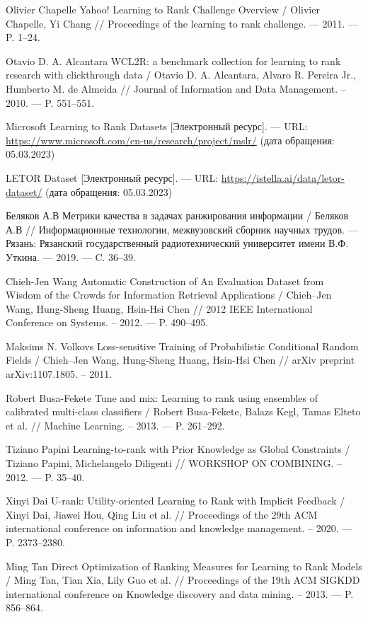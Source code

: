 \begin{thebibliography}{}
 Olivier Chapelle Yahoo! Learning to Rank Challenge Overview / Olivier Chapelle, Yi Chang  // Proceedings of the learning to rank challenge. --- 2011. --- P. 1--24.

 Otavio D. A. Alcantara WCL2R: a benchmark collection for learning to rank research with clickthrough data / Otavio D. A. Alcantara, Alvaro R. Pereira Jr., Humberto M. de Almeida // Journal of Information and Data Management. – 2010. --- P. 551--551.

 Microsoft Learning to Rank Datasets [Электронный ресурс]. --- URL: \url{https://www.microsoft.com/en-us/research/project/mslr/} (дата обращения: 05.03.2023)

 LETOR Dataset [Электронный ресурс]. --- URL: \url{https://istella.ai/data/letor-dataset/} (дата обращения: 05.03.2023)

 Беляков А.В Метрики качества в задачах ранжирования информации / Беляков А.В // Информационные технологии, межвузовский сборник научных трудов. --- Рязань: Рязанский государственный радиотехнический университет имени В.Ф. Уткина. --- 2019. --- C. 36--39.

 Chieh-Jen Wang Automatic Construction of An Evaluation Dataset from Wisdom of the Crowds for Information Retrieval Applications / Chieh--Jen Wang, Hung-Sheng Huang, Hsin-Hsi Chen // 2012 IEEE International Conference on Systems. – 2012. --- P. 490--495.

 Maksims N. Volkovs Loss-sensitive Training of Probabilistic Conditional Random Fields / Chieh--Jen Wang, Hung-Sheng Huang, Hsin-Hsi Chen // arXiv preprint arXiv:1107.1805. – 2011.

 Robert Busa-Fekete Tune and mix: Learning to rank using ensembles of calibrated multi-class classifiers / Robert Busa-Fekete, Balazs Kegl, Tamas Elteto et al. // Machine Learning. – 2013. --- P. 261--292.

 Tiziano Papini Learning-to-rank with Prior Knowledge as Global Constraints / Tiziano Papini, Michelangelo Diligenti // WORKSHOP ON COMBINING. – 2012. --- P. 35--40.

 Xinyi Dai U-rank: Utility-oriented Learning to Rank with Implicit Feedback / Xinyi Dai, Jiawei Hou, Qing Liu et al. // Proceedings of the 29th ACM international conference on information and knowledge management. – 2020. --- P. 2373--2380.

 Ming Tan Direct Optimization of Ranking Measures for Learning to Rank Models / Ming Tan, Tian Xia, Lily Guo et al. // Proceedings of the 19th ACM SIGKDD international conference on Knowledge discovery and data mining. – 2013. --- P. 856--864.


\end{thebibliography}
